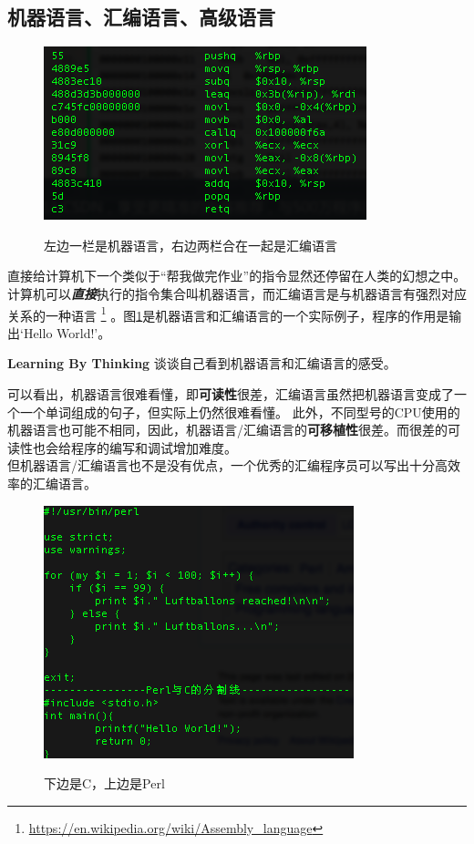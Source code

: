 \subsection{机器语言、汇编语言、高级语言}
\begin{figure}[htbp]
\centering\includegraphics{image/machine_code_and_assemble.png}\\
\caption{左边一栏是机器语言，右边两栏合在一起是汇编语言}\label{fig.machine.language}
\end{figure}
直接给计算机下一个类似于“帮我做完作业”的指令显然还停留在人类的幻想之中。\\
计算机可以\textbf{\textit{直接}}执行的指令集合叫机器语言，而汇编语言是与机器语言有强烈对应关系的一种语言
\footnote{\url{https://en.wikipedia.org/wiki/Assembly_language}}
。图\ref{fig.machine.language}是机器语言和汇编语言的一个实际例子，程序的作用是输出`Hello World!'。\\
\begin{paperbox}{\textbf{Learning By Thinking}\starfour}
谈谈自己看到机器语言和汇编语言的感受。
\end{paperbox}
可以看出，机器语言很难看懂，即\textbf{可读性}很差，汇编语言虽然把机器语言变成了一个一个单词组成的句子，但实际上仍然很难看懂。
此外，不同型号的CPU使用的机器语言也可能不相同，因此，机器语言/汇编语言的\textbf{可移植性}很差。而很差的可读性也会给程序的编写和调试增加难度。\\
但机器语言/汇编语言也不是没有优点，一个优秀的汇编程序员可以写出十分高效率的汇编语言。
\begin{figure}[htb]
\centering\includegraphics{image/perl_c.png}\\
\caption{下边是C，上边是Perl}\label{fig.high.level.language}
\end{figure}
